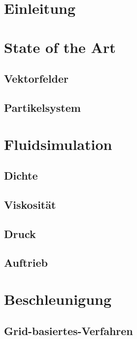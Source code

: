 \documentclass[intern,palatino]{cgBA}
\begin{document}

\section{Einleitung}


\section{State of the Art}
\subsection{Vektorfelder}
\subsection{Partikelsystem}


\section{Fluidsimulation}
\subsection{Dichte}
\subsection{Viskosität}
\subsection{Druck}
\subsection{Auftrieb}


\section{Beschleunigung}
\subsection{Grid-basiertes-Verfahren}
\end{document}
